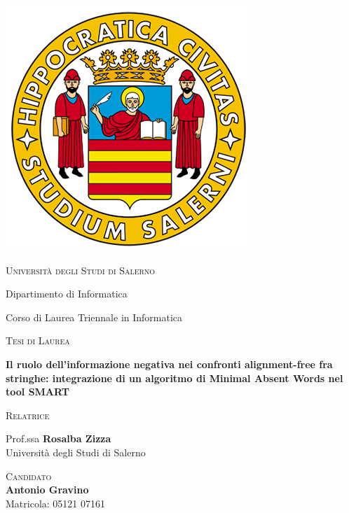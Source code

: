 \documentclass{article}
\begin{document}
    \begin{center}
    
        \includegraphics[scale=0.2]{assets/logo_standard.png}
    
        \vspace{2mm}
    
        \textsc{\huge Università degli Studi di Salerno}
        
        \vspace{5mm}
        
        {\LARGE Dipartimento di Informatica}
        
        {\LARGE Corso di Laurea Triennale in Informatica}
        
        \vspace{10mm}
        
        \textsc{\huge Tesi di Laurea}
        
        \vspace{10mm}
        
        \textbf{\huge Il ruolo dell'informazione negativa nei confronti alignment-free fra stringhe: integrazione di un algoritmo di Minimal Absent Words nel tool SMART}
        
    \end{center}
    
        \vspace{20mm}
    
        {\large {}
            \begin{multicols}{2}
                \begin{adjustwidth}{0pt}{0pt}\textsc{Relatrice}\end{adjustwidth}
                Prof.ssa \textbf{Rosalba Zizza}\\
                Università degli Studi di Salerno
                
                \columnbreak
                
                \hspace*{\fill}\textsc{Candidato}\\
                \hspace*{\fill}\textbf{Antonio Gravino}\\
                \hspace*{\fill}Matricola: 05121 07161
            \end{multicols}
        }
        
\end{document}
